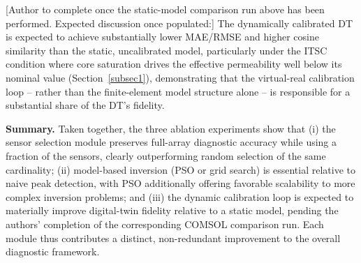 [Author to complete once the static-model comparison run above has
been performed. Expected discussion once populated:] The dynamically
calibrated DT is expected to achieve substantially lower MAE/RMSE and
higher cosine similarity than the static, uncalibrated model,
particularly under the ITSC condition where core saturation drives the
effective permeability well below its nominal value (Section~\ref{subsec1}),
demonstrating that the virtual-real calibration loop -- rather than
the finite-element model structure alone -- is responsible for a
substantial share of the DT's fidelity.

\textbf{Summary.} Taken together, the three ablation experiments show
that (i) the sensor selection module preserves full-array diagnostic
accuracy while using a fraction of the sensors, clearly outperforming
random selection of the same cardinality; (ii) model-based inversion
(PSO or grid search) is essential relative to naive peak detection,
with PSO additionally offering favorable scalability to more complex
inversion problems; and (iii) the dynamic calibration loop is expected
to materially improve digital-twin fidelity relative to a static model,
pending the authors' completion of the corresponding COMSOL comparison
run. Each module thus contributes a distinct, non-redundant
improvement to the overall diagnostic framework.
